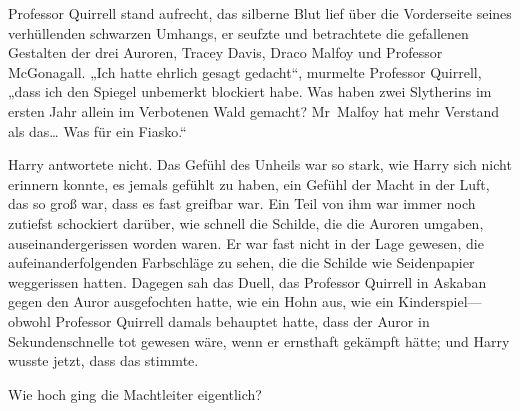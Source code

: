 Professor Quirrell stand aufrecht, das silberne Blut lief über die Vorderseite seines verhüllenden schwarzen Umhangs, er seufzte und betrachtete die gefallenen Gestalten der drei Auroren, Tracey Davis, Draco Malfoy und Professor McGonagall.
„Ich hatte ehrlich gesagt gedacht“, murmelte Professor Quirrell, „dass ich den Spiegel unbemerkt blockiert habe. Was haben zwei Slytherins im ersten Jahr allein im Verbotenen Wald gemacht? Mr~Malfoy hat mehr Verstand als das… Was für ein Fiasko.“

Harry antwortete nicht. Das Gefühl des Unheils war so stark, wie Harry sich nicht erinnern konnte, es jemals gefühlt zu haben, ein Gefühl der Macht in der Luft, das so groß war, dass es fast greifbar war. Ein Teil von ihm war immer noch zutiefst schockiert darüber, wie schnell die Schilde, die die Auroren umgaben, auseinandergerissen worden waren. Er war fast nicht in der Lage gewesen, die aufeinanderfolgenden Farbschläge zu sehen, die die Schilde wie Seidenpapier weggerissen hatten. Dagegen sah das Duell, das Professor Quirrell in Askaban gegen den Auror ausgefochten hatte, wie ein Hohn aus, wie ein Kinderspiel—obwohl Professor Quirrell damals behauptet hatte, dass der Auror in Sekundenschnelle tot gewesen wäre, wenn er ernsthaft gekämpft hätte; und Harry wusste jetzt, dass das stimmte.

Wie hoch ging die Machtleiter eigentlich?


